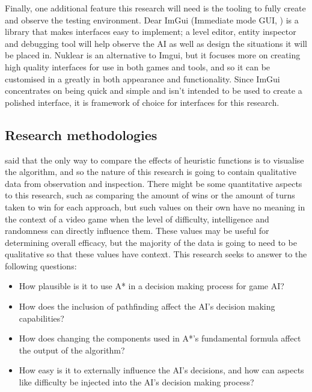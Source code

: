 \documentclass[11pt, a4paper]{report}
\begin{document}
Finally, one additional feature this research will need is the tooling to fully create and observe the testing environment. Dear ImGui (Immediate mode GUI, \cite{Imgui}) is a library that makes interfaces easy to implement; a level editor, entity inspector and debugging tool will help observe the AI as well as design the situations it will be placed in. Nuklear \parencite{Nuklear} is an alternative to Imgui, but it focuses more on creating high quality interfaces for use in both games and tools, and so it can be customised in a greatly in both appearance and functionality. Since ImGui concentrates on being quick and simple and isn't intended to be used to create a polished interface, it is framework of choice for interfaces for this research.

\subsection{Research methodologies}
\label{subsec:researchMethodologies}

\citeauthor{millington2019ai} \parencite*[236]{millington2019ai} said that the only way to compare the effects of heuristic functions is to visualise the algorithm, and so the nature of this research is going to contain qualitative data from observation and inspection. There might be some quantitative aspects to this research, such as comparing the amount of wins or the amount of turns taken to win for each approach, but such values on their own have no meaning in the context of a video game when the level of difficulty, intelligence and randomness can directly influence them. These values may be useful for determining overall efficacy, but the majority of the data is going to need to be qualitative so that these values have context. This research seeks to answer to the following questions:

\begin{itemize}
\item How plausible is it to use A* in a decision making process for game AI?
\item How does the inclusion of pathfinding affect the AI's decision making capabilities?
\item How does changing the components used in A*'s fundamental formula affect the output of the algorithm?
\item How easy is it to externally influence the AI's decisions, and how can aspects like difficulty be injected into the AI's decision making process?
\end{itemize}
\end{document}
